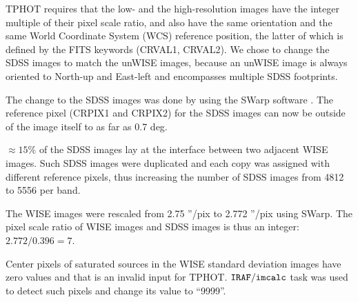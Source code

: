 \documentclass[numberedappendix,apj,twocolumn]{emulateapj}
\begin{document}

TPHOT requires that the low- and the high-resolution images have the integer multiple of their pixel scale ratio, and also have the same orientation and the same World Coordinate System (WCS) reference position, the latter of which is defined by the FITS keywords (CRVAL1, CRVAL2). We chose to change the SDSS images to match the unWISE images, because an unWISE image is always oriented to North-up and East-left and encompasses multiple SDSS footprints. 

The change to the SDSS images was done by using the SWarp software \citep[][]{Bertin2002}. The reference pixel (CRPIX1 and CRPIX2) for the SDSS images can now be outside of the image itself to as far as 0.7 deg.

$\approx15\%$ of the SDSS images lay at the interface between two adjacent WISE images. Such SDSS images were duplicated and each copy was assigned with different reference pixels, thus increasing the number of SDSS images from  4812 to 5556 per band.

The WISE images were rescaled from 2.75 ''/pix to 2.772 ''/pix using SWarp. The pixel scale ratio of WISE images and SDSS images is thus an integer: $2.772/0.396 = 7$.

Center pixels of saturated sources in the WISE standard deviation images have zero values and that is an invalid input for TPHOT. $\tt IRAF/imcalc$ task was used to detect such pixels and change its value to ``9999''.

\end{document}
